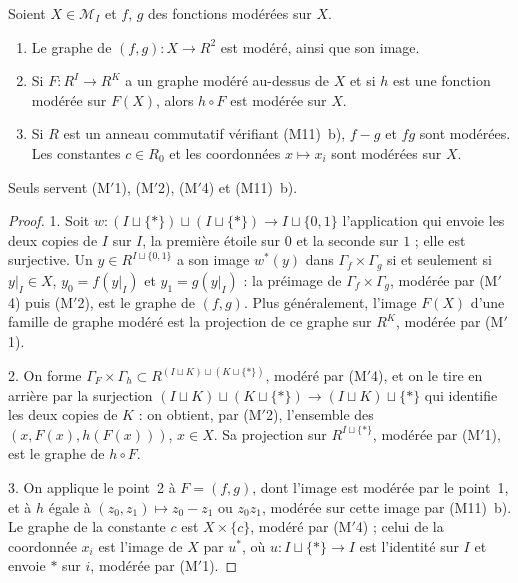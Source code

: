 \begin{lemme}[pages 5 et 20]\label{lem:120-anneau}
Soient $X \in \mathcal M_I$ et $f$, $g$ des fonctions modérées sur $X$.
\begin{enumerate}
\item Le graphe de $(f, g) : X \to R^2$ est modéré, ainsi que son image.
\item Si $F : R^I \to R^K$ a un graphe modéré au-dessus de $X$ et si $h$ est une fonction modérée sur $F(X)$, alors $h \circ F$ est modérée sur $X$.
\item Si $R$ est un anneau commutatif vérifiant (M11)~b), $f - g$ et $fg$ sont modérées. Les constantes $c \in R_0$ et les coordonnées $x \mapsto x_i$ sont modérées sur $X$.
\end{enumerate}
Seuls servent (M$'$1), (M$'$2), (M$'$4) et (M11)~b).
\end{lemme}

\begin{proof}
1. Soit $w : (I \sqcup \{\ast\}) \sqcup (I \sqcup \{\ast\}) \to I \sqcup \{0, 1\}$ l'application qui envoie les deux copies de $I$ sur $I$, la première étoile sur $0$ et la seconde sur $1$ ; elle est surjective. Un $y \in R^{I \sqcup \{0,1\}}$ a son image $w^*(y)$ dans $\Gamma_f \times \Gamma_g$ si et seulement si $y|_I \in X$, $y_0 = f(y|_I)$ et $y_1 = g(y|_I)$ : la préimage de $\Gamma_f \times \Gamma_g$, modérée par (M$'$4) puis (M$'$2), est le graphe de $(f, g)$. Plus généralement, l'image $F(X)$ d'une famille de graphe modéré est la projection de ce graphe sur $R^K$, modérée par (M$'$1).

2. On forme $\Gamma_F \times \Gamma_h \subset R^{(I \sqcup K) \sqcup (K \sqcup \{\ast\})}$, modéré par (M$'$4), et on le tire en arrière par la surjection $(I \sqcup K) \sqcup (K \sqcup \{\ast\}) \to (I \sqcup K) \sqcup \{\ast\}$ qui identifie les deux copies de $K$ : on obtient, par (M$'$2), l'ensemble des $(x, F(x), h(F(x)))$, $x \in X$. Sa projection sur $R^{I \sqcup \{\ast\}}$, modérée par (M$'$1), est le graphe de $h \circ F$.

3. On applique le point~2 à $F = (f, g)$, dont l'image est modérée par le point~1, et à $h$ égale à $(z_0, z_1) \mapsto z_0 - z_1$ ou $z_0 z_1$, modérée sur cette image par (M11)~b). Le graphe de la constante $c$ est $X \times \{c\}$, modéré par (M$'$4) ; celui de la coordonnée $x_i$ est l'image de $X$ par $u^*$, où $u : I \sqcup \{\ast\} \to I$ est l'identité sur $I$ et envoie $\ast$ sur $i$, modérée par (M$'$1).
\end{proof}

